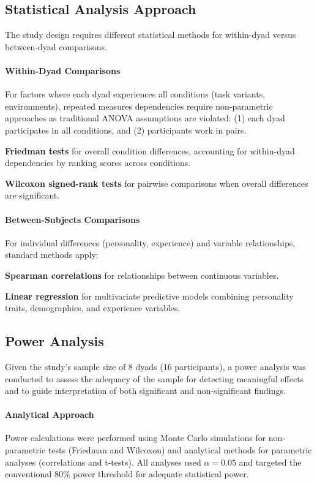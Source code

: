 \subsection{Statistical Analysis Approach}

The study design requires different statistical methods for within-dyad versus between-dyad comparisons.

\paragraph{Within-Dyad Comparisons}
For factors where each dyad experiences all conditions (task variants, environments), repeated measures dependencies require non-parametric approaches as traditional ANOVA assumptions are violated: (1) each dyad participates in 
all conditions, and (2) participants work in pairs.

\textbf{Friedman tests} for overall condition differences, accounting for within-dyad dependencies by ranking scores across conditions.

\textbf{Wilcoxon signed-rank tests} for pairwise comparisons when overall differences are significant.

\paragraph{Between-Subjects Comparisons}
For individual differences (personality, experience) and variable relationships, standard methods apply:

\textbf{Spearman correlations} for relationships between continuous variables.

\textbf{Linear regression} for multivariate predictive models combining personality traits, demographics, and experience variables.

\subsection{Power Analysis}

Given the study's sample size of 8 dyads (16 participants), a power analysis was conducted to assess the adequacy of the sample for detecting meaningful effects and to guide interpretation of both significant and non-significant findings.

\paragraph{Analytical Approach}
Power calculations were performed using Monte Carlo simulations for non-parametric tests (Friedman and Wilcoxon) and analytical methods for parametric analyses (correlations and t-tests). All analyses used $\alpha = 0.05$ and targeted the conventional 80\% power threshold for adequate statistical power.


